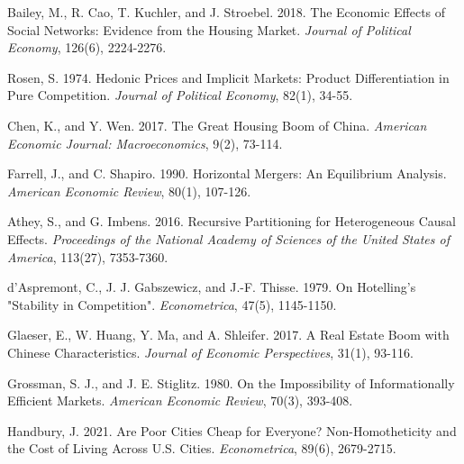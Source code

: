 \documentclass[11pt]{article}
\begin{document}
\clearpage
\begin{singlespace}
%
%
% 
% 

\begin{thebibliography}{}

  Bailey, M., R. Cao, T. Kuchler, and J. Stroebel. 2018. The Economic Effects of Social Networks: Evidence from the Housing Market. \textit{Journal of Political Economy}, 126(6), 2224-2276.
  
  Rosen, S. 1974. Hedonic Prices and Implicit Markets: Product Differentiation in Pure Competition. \textit{Journal of Political Economy}, 82(1), 34-55.%
  
  Chen, K., and Y. Wen. 2017. The Great Housing Boom of China. \textit{American Economic Journal: Macroeconomics}, 9(2), 73-114.
  
  Farrell, J., and C. Shapiro. 1990. Horizontal Mergers: An Equilibrium Analysis. \textit{American Economic Review}, 80(1), 107-126.
  
  Athey, S., and G. Imbens. 2016. Recursive Partitioning for Heterogeneous Causal Effects. \textit{Proceedings of the National Academy of Sciences of the United States of America}, 113(27), 7353-7360.
  
  d'Aspremont, C., J. J. Gabszewicz, and J.-F. Thisse. 1979. On Hotelling’s "Stability in Competition". \textit{Econometrica}, 47(5), 1145-1150.
  
  Glaeser, E., W. Huang, Y. Ma, and A. Shleifer. 2017. A Real Estate Boom with Chinese Characteristics. \textit{Journal of Economic Perspectives}, 31(1), 93-116.
  
  Grossman, S. J., and J. E. Stiglitz. 1980. On the Impossibility of Informationally Efficient Markets. \textit{American Economic Review}, 70(3), 393-408.
  
  Handbury, J. 2021. Are Poor Cities Cheap for Everyone? Non-Homotheticity and the Cost of Living Across U.S. Cities. \textit{Econometrica}, 89(6), 2679-2715.
  

\end{thebibliography}
\end{singlespace}
\end{document}
